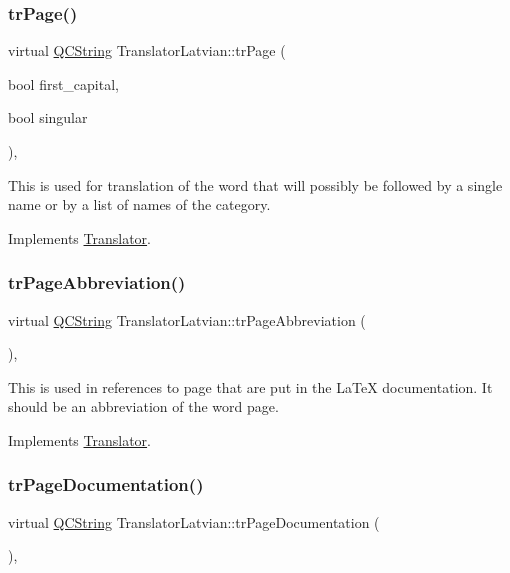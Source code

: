 \subsubsection{\texorpdfstring{trPage()}{trPage()}}
{\footnotesize\ttfamily virtual \mbox{\hyperlink{class_q_c_string}{Q\+C\+String}} Translator\+Latvian\+::tr\+Page (\begin{DoxyParamCaption}\item[{bool}]{first\+\_\+capital,  }\item[{bool}]{singular }\end{DoxyParamCaption})\hspace{0.3cm}{\ttfamily [inline]}, {\ttfamily [virtual]}}

This is used for translation of the word that will possibly be followed by a single name or by a list of names of the category. 

Implements \mbox{\hyperlink{class_translator}{Translator}}.

\mbox{\label{class_translator_latvian_aceb4e5b6fc3616b2f4e9a33f16935278}} 
\subsubsection{\texorpdfstring{trPageAbbreviation()}{trPageAbbreviation()}}
{\footnotesize\ttfamily virtual \mbox{\hyperlink{class_q_c_string}{Q\+C\+String}} Translator\+Latvian\+::tr\+Page\+Abbreviation (\begin{DoxyParamCaption}{ }\end{DoxyParamCaption})\hspace{0.3cm}{\ttfamily [inline]}, {\ttfamily [virtual]}}

This is used in references to page that are put in the La\+TeX documentation. It should be an abbreviation of the word page. 

Implements \mbox{\hyperlink{class_translator}{Translator}}.

\mbox{\label{class_translator_latvian_ad05c6ec1569e74b47f65a2215195e6ee}} 
\subsubsection{\texorpdfstring{trPageDocumentation()}{trPageDocumentation()}}
{\footnotesize\ttfamily virtual \mbox{\hyperlink{class_q_c_string}{Q\+C\+String}} Translator\+Latvian\+::tr\+Page\+Documentation (\begin{DoxyParamCaption}{ }\end{DoxyParamCaption})\hspace{0.3cm}{\ttfamily [inline]}, {\ttfamily [virtual]}}

